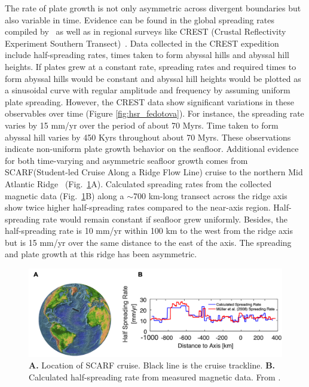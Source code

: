 \documentclass[letterpaper,12pt,notitle]{memphisthesis}                     %
\begin{document}
The rate of plate growth is not only asymmetric across divergent boundaries but also variable in time. Evidence can be found in the global spreading rates compiled by~\citet{Muller2008} as well as in regional surveys like CREST (Crustal Reflectivity Experiment Southern Transect)~\citep{Fedotova2017}. Data collected in the CREST expedition include half-spreading rates, times taken to form abyssal hills and abyssal hill heights. If plates grew at a constant rate, spreading rates and required times to form abyssal hills would be constant and abyssal hill heights would be plotted as a sinusoidal curve with regular amplitude and frequency by assuming uniform plate spreading. However, the CREST data show significant variations in these observables over time (Figure \ref{fig:hsr_fedotova}). For instance, the spreading rate varies by 15 mm/yr over the period of about 70 Myrs. Time taken to form abyssal hill varies by 450 Kyrs throughout about 70 Myrs. These observations indicate non-uniform plate growth behavior on the seafloor.
%
Additional evidence for both time-varying and asymmetric seafloor growth comes from SCARF(Student-led Cruise Along a Ridge Flow Line) cruise to the northern Mid Atlantic Ridge~\citep{Shinevar2018} (Fig.~\ref{fig:scarf}A). Calculated spreading rates from the collected magnetic data (Fig.~\ref{fig:scarf}B) along a $\sim$700 km-long transect across the ridge axis show twice higher half-spreading rates compared to the near-axis region. Half-spreading rate would remain constant if seafloor grew uniformly. Besides, the half-spreading rate is 10 mm/yr within 100 km to the west from the ridge axis but is 15 mm/yr over the same distance to the east of the axis. The spreading and plate growth at this ridge has been asymmetric. 
%
\begin{figure}[!htb]
	\centering
	\includegraphics[width=0.85\linewidth,trim=4 4 2 12,clip]{./figs/scarf.png}
	\caption{\textbf{A.} Location of SCARF cruise. Black line is the cruise trackline. \textbf{B.} Calculated half-spreading rate from measured magnetic data. From \citet{Shinevar2018}.}
	\label{fig:scarf}
\end{figure}
\end{document}
